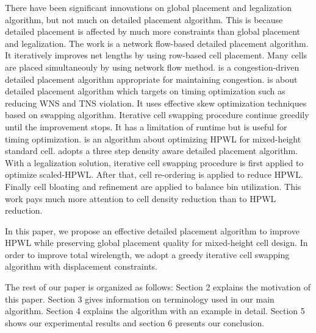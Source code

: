 \documentclass[sigconf,authordraft]{acmart}
\begin{document}
There have been significant innovations on global placement \cite{kim2011simplr,he2013ripple,liu2013optimization,hsu2011routability,li2014analytical,kim2012complx} and legalization algorithm\cite{spindler2008abacus, zhu2018mixed, wang2017effective, hung2017mixed}, but not much on detailed placement algorithm. This is because detailed placement is affected by much more constraints than global placement and legalization. The work \cite{doll1994iterative} is a network flow-based detailed placement algorithm. It iteratively improves net lengths by using row-based cell placement. Many cells are placed simultaneouly by using network flow method. \cite{he2011ripple} is a congestion-driven detailed placement algorithm appropriate for maintaining congestion. \cite{monteiro2015analytical} is about detailed placement algorithm which targets on timing optimization such as reducing WNS and TNS violation. It uses effective skew optimization techniques based on swapping algorithm. Iterative cell swapping procedure continue greedily until the improvement stops. It has a limitation of runtime but is useful for timing optimization. \cite{diao2010effective} is an algorithm about optimizing HPWL for mixed-height standard cell. \cite{zhou2014effective} adopts a three step density aware detailed placement algorithm. With a legalization solution, iterative cell swapping procedure is first applied to optimize scaled-HPWL. After that, cell re-ordering is applied to reduce HPWL. Finally cell bloating and refinement are applied to balance bin utilization. This work pays much more attention to cell density reduction than to HPWL reduction.  \par

In this paper, we propose an effective detailed placement algorithm to improve HPWL while preserving global placement quality for mixed-height cell design. In order to improve total wirelength, we adopt a greedy iterative cell swapping algorithm with displacement constraints. \par
 The rest of our paper is organized as follows: Section 2 explains the motivation of this paper. Section 3 gives information on terminology used in our main algorithm. Section 4 explains the algorithm with an example in detail. Section 5 shows our experimental results and section 6 presents our conclusion.
\end{document}
